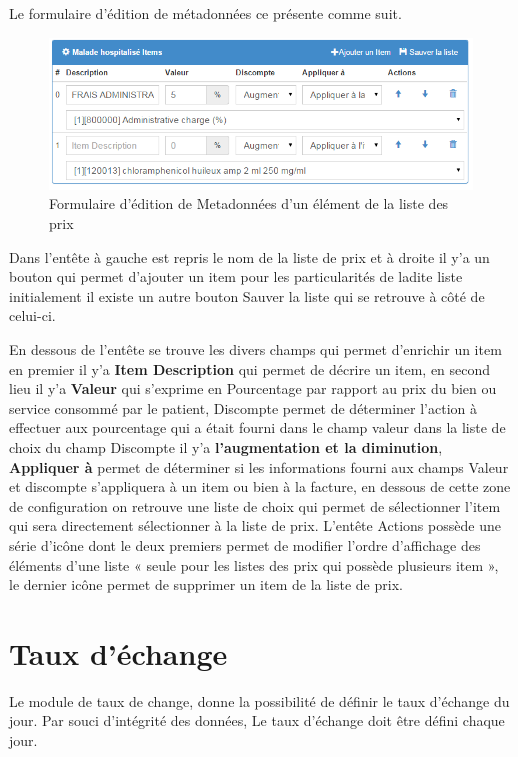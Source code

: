 \documentclass[12pt,a4paper]{report}
\begin{document}
Le formulaire d'édition de métadonnées ce présente comme suit.
\newpage
\begin{figure}[h]
\begin{center}
\includegraphics[width=14cm]{pic/EditionMetaDonneListeP.png}
\end{center}
\caption{Formulaire d'édition de Metadonnées d'un élément de la liste des prix}
\label{Formulaire permettant de mettre à jour un élément de la liste de prix}
\end{figure}

Dans l'entête à gauche est repris le nom de la liste de prix et à droite il y'a un bouton qui permet d'ajouter un item pour les particularités de ladite liste initialement il existe un autre bouton Sauver la liste qui se retrouve à côté de celui-ci.

En dessous de l'entête se trouve les divers champs qui permet d'enrichir un item en premier il y'a \textbf{Item Description} qui permet de décrire un item, en second lieu il y'a \textbf{Valeur} qui s'exprime en Pourcentage par rapport au prix du bien ou service consommé par le patient, Discompte permet de déterminer l'action à effectuer aux pourcentage qui a était fourni dans le champ valeur dans la liste de choix du champ Discompte il y'a \textbf{l'augmentation et la diminution}, \textbf{Appliquer à} permet de déterminer si les informations fourni   aux champs Valeur et discompte s'appliquera à un item ou bien à la facture, en dessous de cette zone de configuration on retrouve une liste de choix qui permet de sélectionner l'item qui sera directement sélectionner à la liste de prix. L'entête Actions possède une série d'icône dont le deux premiers permet de modifier l'ordre d'affichage des éléments d'une liste « seule pour les listes des prix qui possède plusieurs item », le dernier icône permet de supprimer un item de la liste de prix.
\newpage
\section{Taux d'échange}
Le module de taux de change, donne la possibilité de définir le taux d'échange du jour. Par souci d'intégrité des données, Le taux d'échange doit être défini chaque jour.
\end{document}
